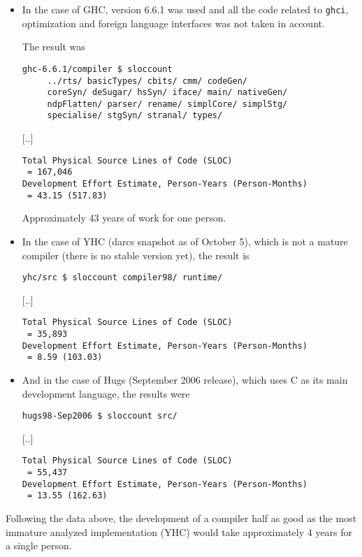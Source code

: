 \documentclass[a4paper,twoside,11pt]{article}
\begin{document}
\begin{itemize}
\item In the case of GHC, version 6.6.1 was used and all the code related to
  \texttt{ghci}, optimization and foreign language interfaces was not taken in
  account.
  
  The result was

  
\begin{verbatim}
ghc-6.6.1/compiler $ sloccount 
     ../rts/ basicTypes/ cbits/ cmm/ codeGen/ 
     coreSyn/ deSugar/ hsSyn/ iface/ main/ nativeGen/ 
     ndpFlatten/ parser/ rename/ simplCore/ simplStg/
     specialise/ stgSyn/ stranal/ types/
\end{verbatim} 
[..]
\begin{verbatim}
Total Physical Source Lines of Code (SLOC)                
 = 167,046
Development Effort Estimate, Person-Years (Person-Months) 
 = 43.15 (517.83)
\end{verbatim}
  
Approximately 43 years of work for one person.

\item In the case of YHC (darcs snapshot as of October 5), which is not a
  mature compiler (there is no stable version yet), the result is

\begin{verbatim}
yhc/src $ sloccount compiler98/ runtime/ 
\end{verbatim} 
[..]
\begin{verbatim}
Total Physical Source Lines of Code (SLOC)                
 = 35,893
Development Effort Estimate, Person-Years (Person-Months) 
 = 8.59 (103.03)
\end{verbatim}

\item And in the case of Hugs (September 2006 release), which 
  uses C as its main development language, the results were

\begin{verbatim}
hugs98-Sep2006 $ sloccount src/ 
\end{verbatim} 
[..]
\begin{verbatim}
Total Physical Source Lines of Code (SLOC)                
 = 55,437
Development Effort Estimate, Person-Years (Person-Months) 
 = 13.55 (162.63)
\end{verbatim}

\end{itemize}

Following the data above, the development of a compiler half as good as the
most immature analyzed implementation (YHC) would take approximately 4 years
for a single person.
\end{document}
